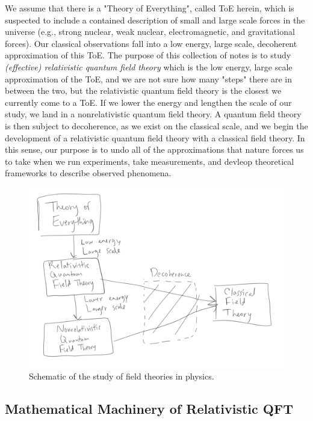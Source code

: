 We assume that there is a "Theory of Everything", called ToE herein, which is suspected to include a contained description of small and large scale forces in the universe (e.g., strong nuclear, weak nuclear, electromagnetic, and gravitational forces). Our classical observations fall into a low energy, large scale, decoherent approximation of this ToE. The purpose of this collection of notes is to study \textit{(effective) relativistic quantum field theory} which is the low energy, large scale approximation of the ToE, and we are not sure how many "steps" there are in between the two, but the relativistic quantum field theory is the closest we currently come to a ToE. If we lower the energy and lengthen the scale of our study, we land in a nonrelativistic quantum field theory. A quantum field theory is then subject to decoherence, as we exist on the classical scale, and we begin the development of a relativistic quantum field theory with a classical field theory. In this sense, our purpose is to undo all of the approximations that nature forces us to take when we run experiments, take measurements, and devleop theoretical frameworks to describe observed phenomena.

\begin{figure}[H]
	\centering
	\includegraphics[width=\linewidth]{toe.png}
	\caption{Schematic of the study of field theories in physics.}
	\label{fig:fig1}
\end{figure}

\clearpage

\subsection*{Mathematical Machinery of Relativistic QFT}


